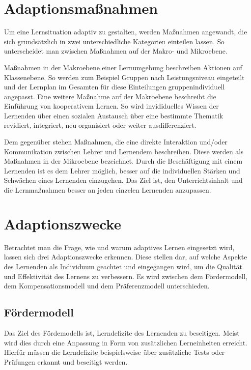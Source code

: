 \section{Adaptionsmaßnahmen}
Um eine Lernsituation adaptiv zu gestalten, werden Maßnahmen angewandt, die sich grundsätzlich in zwei
unterschiedliche Kategorien einteilen lassen. So unterscheidet man zwischen Maßnahmen auf der Makro- und Mikroebene.

Maßnahmen in der Makroebene einer Lernumgebung beschreiben Aktionen auf Klassenebene.
So werden zum Beispiel Gruppen nach Leistungsniveau eingeteilt und der Lernplan im Gesamten für
diese Einteilungen gruppenindividuell angepasst. Eine weitere Maßnahme auf der Makroebene beschreibt
die Einführung von kooperativem Lernen. So wird invididuelles Wissen der Lernenden über einen sozialen Austausch
über eine bestimmte Thematik revidiert, integriert, neu organisiert oder weiter ausdifferenziert.

Dem gegenüber stehen Maßnahmen, die eine direkte Interaktion und/oder Kommunikation zwischen Lehrer und Lernendem beschreiben.
Diese werden als Maßnahmen in der Mikroebene bezeichnet. Durch die Beschäftigung mit einem Lernenden
ist es dem Lehrer möglich, besser auf die individuellen Stärken und Schwächen eines Lernenden einzugehen.
Das Ziel ist, den Unterrichtsinhalt und die Lernmaßnahmen besser an jeden einzelen Lernenden anzupassen.

\section{Adaptionszwecke}
Betrachtet man die Frage, wie und warum adaptives Lernen eingesetzt wird, lassen sich drei Adaptionszwecke erkennen.
Diese stellen dar, auf welche Aspekte des Lernenden als Individuum geachtet und eingegangen wird, um die
Qualität und Effektivität des Lernens zu verbessern.
Es wird zwischen dem Fördermodell, dem Kompensationsmodell und dem Präferenzmodell unterschieden.

\subsection{Fördermodell}
Das Ziel des Fördemodells ist, Lerndefizite des Lernenden zu beseitigen.
Meist wird dies durch eine Anpassung in Form von zusätzlichen Lerneinheiten erreicht.
Hierfür müssen die Lerndefizite beispielsweise über zusätzliche Tests oder Prüfungen erkannt
und beseitigt werden. \cite[S. 19]{lehmann2010lernstile}

